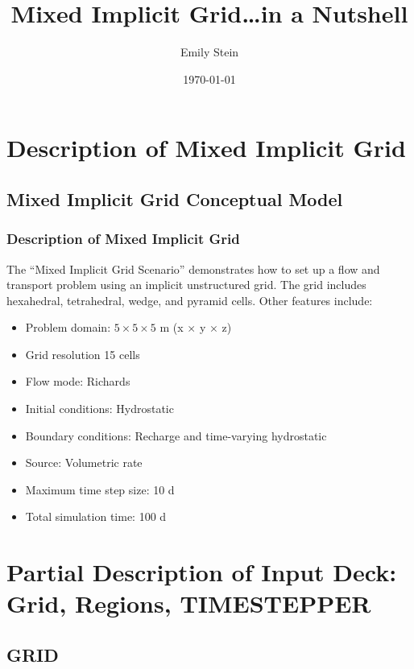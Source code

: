 \documentclass{beamer}
\begin{document}
\title{Mixed Implicit Grid\ldots in a Nutshell}
\author{Emily Stein}
\date{\today}


\section{Description of Mixed Implicit Grid}

\subsection{Mixed Implicit Grid Conceptual Model}

\begin{frame}\frametitle{Description of Mixed Implicit Grid}
The ``Mixed Implicit Grid Scenario'' demonstrates how to set up a flow and transport problem using an implicit unstructured grid.  The grid includes hexahedral, tetrahedral, wedge, and pyramid cells.  Other features include:
\begin{itemize}
  \item Problem domain: $5 \times 5 \times 5$ m (x $\times$ y $\times$ z)
  \item Grid resolution 15 cells
  \item Flow mode: Richards
  \item Initial conditions: Hydrostatic
  \item Boundary conditions: Recharge and time-varying hydrostatic
  \item Source: Volumetric rate
  \item Maximum time step size: 10 d
  \item Total simulation time: 100 d
\end{itemize}

\end{frame}

\section{Partial Description of Input Deck: Grid, Regions, TIMESTEPPER}

\subsection{GRID}
\end{document}
